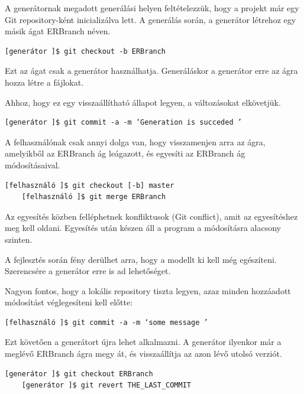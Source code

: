 \documentclass[a4paper,12pt,oneside]{report}
\begin{document}
\begin{justify}
	A generátornak megadott generálási helyen feltételezzük, hogy a projekt már egy Git repository-ként inicializálva lett. A generálás során, a generátor létrehoz egy másik ágat ERBranch néven. 

	\begin{lstlisting}[language=GitBash]
	[generátor ]$ git checkout -b ERBranch 
	\end{lstlisting}

    Ezt az ágat csak a generátor használhatja. Generáláskor a generátor erre az ágra hozza létre a fájlokat. 
    
    Ahhoz, hogy ez egy visszaállítható állapot legyen, a változásokat elkövetjük. 

	\begin{lstlisting}[language=GitBash]
	[generátor ]$ git commit -a -m ‘Generation is succeded ’
	\end{lstlisting}

	A felhasználónak csak annyi dolga van, hogy visszamenjen arra az ágra, amelyikből az ERBranch ág leágazott, és egyesíti az ERBranch ág módosításaival.

	\begin{lstlisting}[language=GitBash]
	[felhasználó ]$ git checkout [-b] master
	[felhasználó ]$ git merge ERBranch
	\end{lstlisting}

	Az egyesítés közben felléphetnek konfliktusok (Git conflict), amit az egyesítéshez meg kell oldani. Egyesítés után készen áll a program a módosításra alacsony szinten.

    A fejlesztés során fény derülhet arra, hogy a modellt ki kell még egészíteni. Szerencsére a generátor erre is ad lehetőséget. 
    
    Nagyon fontos, hogy a lokális repository tiszta legyen, azaz minden hozzáadott módosítást véglegesíteni kell előtte:

	\begin{lstlisting}[language=GitBash]
	[felhasználó ]$ git commit -a -m ‘some message ’
	\end{lstlisting}

	Ezt követően a generátort újra lehet alkalmazni. A generátor ilyenkor már a meglévő ERBranch ágra megy át, és visszaállítja az azon lévő utolsó verziót.

	\begin{lstlisting}[language=GitBash]
	[generátor ]$ git checkout ERBranch
	[generátor ]$ git revert THE_LAST_COMMIT
	\end{lstlisting}


\end{justify}
\end{document}
